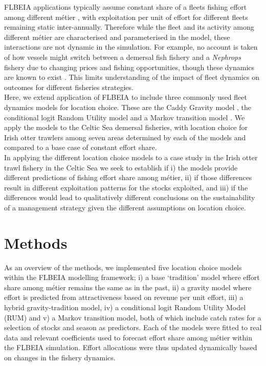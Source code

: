 \documentclass[12pt, halfline, a4paper]{ouparticle}
\begin{document}
FLBEIA applications typically assume constant share of a fleets fishing effort
among different métier \citep{Ulrich2016, Garcia2020}, with exploitation per
unit of effort for different fleets remaining static inter-annually. Therefore
while the fleet and its activity among different métier are characterised and
parameterised in the model, these interactions are not dynamic in the
simulation. For example, no account is taken of how vessels might switch
between a demersal fish fishery and a \textit{Nephrops} fishery due to changing
prices and fishing opportunities, though these dynamics are known to exist
\citep{Davie2011}. This limits understanding of the impact of fleet dynamics on
outcomes for different fisheries strategies. \\ 

Here, we extend application of FLBEIA to include three commonly used fleet
dynamics models for location choice. These are the Caddy Gravity model
\citep{Caddy1975}, the conditional logit Random Utility model
\citep{McFadden1973} and a Markov transition model \citep{Venables2009}. We
apply the models to the Celtic Sea demersal fisheries, with location choice for
Irish otter trawlers among seven areas determined by each of the models and
compared to a base case of constant effort share. \\ 

In applying the different location choice models to a case study in the Irish
otter trawl fishery in the Celtic Sea we seek to establish if i) the models
provide different predictions of fishing effort share among métier, ii) if
those differences result in different exploitation patterns for the stocks
exploited, and iii) if the differences would lead to qualitatively different
conclusions on the sustainability of a management strategy given the different
assumptions on location choice. \\

\section{Methods}
\label{meth}

As an overview of the methods, we implemented five location choice models
within the FLBEIA modelling framework; i) a base `tradition' model where effort
share among métier remains the same as in the past, ii) a gravity model where
effort is predicted from attractiveness based on revenue per unit effort, iii)
a hybrid gravity-tradition model, iv) a conditional logit Random Utility Model
(RUM) and v) a Markov transition model, both of which include catch rates for a
selection of stocks and season as predictors. Each of the models were fitted to
real data and relevant coefficients used to forecast effort share among métier
within the FLBEIA simulation.  Effort allocations were thus updated dynamically
based on changes in the fishery dynamics.\\
\end{document}
